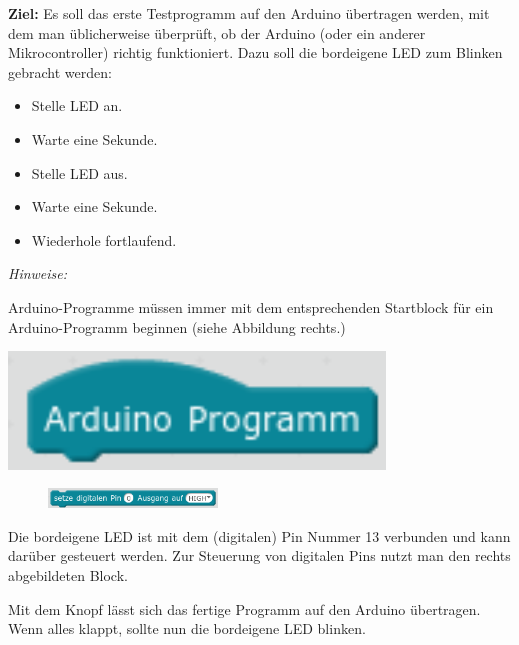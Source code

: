 \begin{ziel}
	\textbf{Ziel:} Es soll das erste Testprogramm auf den Arduino übertragen werden, mit dem man üblicherweise überprüft, ob der Arduino (oder ein anderer Mikrocontroller) richtig funktioniert. Dazu soll die bordeigene LED zum Blinken gebracht werden:
	\begin{itemize}[itemsep=0ex]
		\item Stelle LED an.
		\item Warte eine Sekunde.
		\item Stelle LED aus.
		\item Warte eine Sekunde.
		\item Wiederhole fortlaufend.
	\end{itemize}
\end{ziel}

\emph{Hinweise:} 
\medskip

\begin{minipage}{0.7\textwidth}
	Arduino-Programme müssen immer mit dem entsprechenden Startblock für ein Arduino-Programm beginnen (siehe Abbildung rechts.)
\end{minipage}
\begin{minipage}[]{0.3\textwidth}
	\centering
	\includegraphics[width=0.75\textwidth]{pics/Arduino_Start_Block.png}
	\label{abb:arduinostartblock}
\end{minipage}


\begin{figure}
	\centering
	\includegraphics[width=0.4\textwidth]{pics/digitalWriteBlock.png}
	\label{abb:digitalwriteblock}
\end{figure}
Die bordeigene LED ist mit dem (digitalen) Pin Nummer 13 verbunden und kann darüber gesteuert werden. Zur Steuerung von digitalen Pins nutzt man den rechts abgebildeten Block.

Mit dem Knopf  lässt sich das fertige Programm auf den Arduino übertragen. Wenn alles klappt, sollte nun die bordeigene LED blinken.

